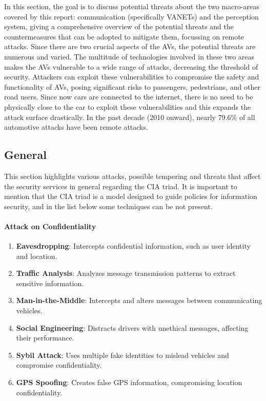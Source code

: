 In this section, the goal is to discuss potential threats about the two macro-areas covered by this report:
communication (specifically VANETs) and the perception system,
giving a comprehensive overview of the potential threats and the
countermeasures that can be adopted to mitigate them, focussing on remote attacks.
Since there are two crucial aspects of the AVs, the potential threats are numerous and varied.
The multitude of technologies involved in these two areas makes the AVs vulnerable to a wide range of attacks,
decreasing the threshold of security.
Attackers can exploit these vulnerabilities to compromise the safety and functionality of AVs, posing significant risks to passengers, pedestrians, and other road users.
Since now cars are connected to the internet, there is no need to be physically close to the car to exploit these vulnerabilities and this expands the attack surface drastically.
In the past decade (2010 onward), nearly 79.6\% of all automotive attacks have been
remote attacks\cite{cybersec}.

\subsection{General}\label{subsec:communication-system}

This section highlights various attacks, possible tempering and threats that affect the security services in general regarding
the CIA triad.
It is important to mention that the CIA triad is a model designed to guide policies for information security, and in the list below some techniques can be not present.

\paragraph{Attack on Confidentiality}
\begin{enumerate}
    \item \textbf{Eavesdropping}: Intercepts confidential information, such as user identity and location.
    \item \textbf{Traffic Analysis}: Analyzes message transmission patterns to extract sensitive information.
    \item \textbf{Man-in-the-Middle}: Intercepts and alters messages between communicating vehicles.
    \item \textbf{Social Engineering}: Distracts drivers with unethical messages, affecting their performance.
    \item \textbf{Sybil Attack}: Uses multiple fake identities to mislead vehicles and compromise confidentiality.
    \item \textbf{GPS Spoofing}: Creates false GPS information, compromising location confidentiality.
\end{enumerate}

